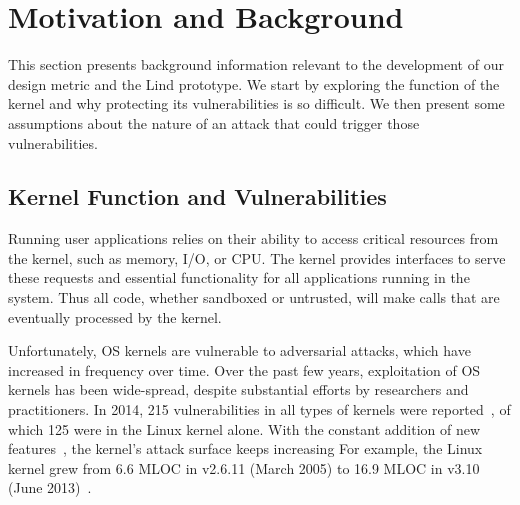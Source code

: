 \section{Motivation and Background}
\label{sec.motivation-and-background}

This section presents background information
relevant to the development of our design metric and the Lind prototype. We
start by exploring the function of the kernel and why protecting its
vulnerabilities is so difficult. We then present some assumptions about
the nature of an attack that could trigger those vulnerabilities.

\subsection{Kernel Function and Vulnerabilities}

Running user applications relies on their ability to access
critical resources from the kernel, such as memory, I/O, or CPU.
The kernel provides interfaces to serve these requests
and essential functionality for all applications running in the system.
Thus all code, whether sandboxed or untrusted, will make calls
that are eventually processed by the kernel.

Unfortunately, OS kernels are vulnerable to adversarial attacks, which have
increased in frequency over time.
Over the past few years, exploitation of OS kernels has been wide-spread,
despite substantial efforts by researchers and practitioners.
In 2014, 215 vulnerabilities in all types of kernels were reported~\cite{NVD},
of which 125 were in the Linux kernel alone.
With the constant addition of new features~\cite{Metrics-13}, the kernel's
attack surface keeps increasing For example, the Linux kernel grew from 6.6 MLOC
in v2.6.11 (March 2005) to 16.9 MLOC in v3.10 (June 2013)~\cite{Linux-13}.


